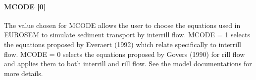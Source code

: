 \paragraph{MCODE [0]}
The value chosen for MCODE allows the user to choose the equations used in
EUROSEM to simulate sediment transport by interrill flow.
MCODE = 1 selects the equations proposed by Everaert (1992) which relate
specifically to interrill flow. MCODE = 0 selects the equations proposed by
Govers (1990) for rill flow and applies them to both interrill and rill flow.
See the model documentations for more details.
